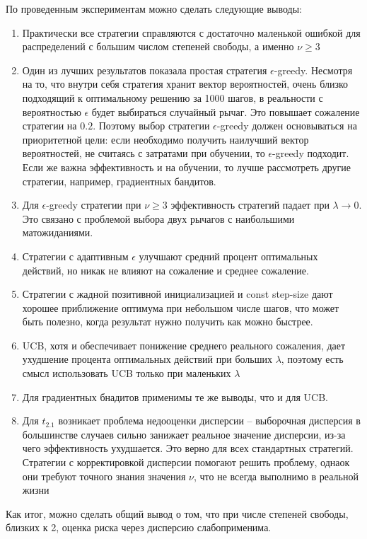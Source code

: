 По проведенным экспериментам можно сделать следующие выводы:
\begin{enumerate}
    \item Практически все стратегии справляются с достаточно маленькой ошибкой для распределений с большим числом степеней свободы, а именно $\nu \geq 3$
    \item Один из лучших результатов показала простая стратегия $\epsilon$-greedy. Несмотря на то, что внутри себя стратегия хранит вектор вероятностей, очень близко подходящий к оптимальному решению за 1000 шагов, в реальности с вероятностью $\epsilon$ будет выбираться случайный рычаг. Это повышает сожаление стратегии на $0.2$. Поэтому выбор стратегии $\epsilon$-greedy должен основываться на приоритетной цели: если необходимо получить наилучший вектор вероятностей, не считаясь с затратами при обучении, то $\epsilon$-greedy подходит. Если же важна эффективность и на обучении, то лучше рассмотреть другие стратегии, например, градиентных бандитов.
    \item Для $\epsilon$-greedy стратегии при $\nu \geq 3$ эффективность стратегий падает при $\lambda \to 0$. Это связано с проблемой выбора двух рычагов с наибольшими матожиданиями.
    \item Стратегии с адаптивным $\epsilon$ улучшают средний процент оптимальных действий, но никак не влияют на сожаление и среднее сожаление.
    \item Стратегии с жадной позитивной инициализацией и const step-size дают хорошее приближение оптимума при небольшом числе шагов, что может быть полезно, когда результат нужно получить как можно быстрее.
    \item UCB, хотя и обеспечивает понижение среднего реального сожаления, дает ухудшение процента оптимальных действий при больших $\lambda$, поэтому есть смысл использовать UCB только при маленьких $\lambda$
    \item Для градиентных бнадитов применимы те же выводы, что и для UCB.
    \item Для $t_{2.1}$ возникает проблема недооценки дисперсии -- выборочная дисперсия в большинстве случаев сильно занижает реальное значение дисперсии, из-за чего эффективность ухудшается. Это верно для всех стандартных стратегий. Стратегии с корректировкой дисперсии помогают решить проблему, однаок они требуют точного знания значения $\nu$, что не всегда выполнимо в реальной жизни
\end{enumerate}

Как итог, можно сделать общий вывод о том, что при числе степеней свободы, близких к 2, оценка риска через дисперсию слабоприменима.